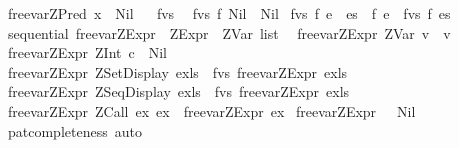 \begin{isabellebody}
{\isacharbar}\ {\isachardoublequoteopen}free{\isacharunderscore}var{\isacharunderscore}ZPred\ x\ {\isacharequal}\ Nil{\isachardoublequoteclose}\isanewline
\isanewline
\ \isanewline
{}\isamarkupfalse%
\ fvs\isanewline
{}\isanewline
\ \ {\isachardoublequoteopen}fvs\ f\ Nil\ {\isacharequal}\ Nil{\isachardoublequoteclose}\isanewline
{\isacharbar}\ {\isachardoublequoteopen}fvs\ f\ {\isacharparenleft}e\ {\isacharhash}\ es{\isacharparenright}\ {\isacharequal}\ {\isacharparenleft}f\ e\ {\isacharat}\ {\isacharparenleft}fvs\ f\ es{\isacharparenright}{\isacharparenright}{\isachardoublequoteclose}\isanewline
\isanewline
\ \isanewline
{}\isamarkupfalse%
\ {\isacharparenleft}sequential{\isacharparenright}\ free{\isacharunderscore}var{\isacharunderscore}ZExpr\ {\isacharcolon}{\isacharcolon}\ {\isachardoublequoteopen}ZExpr\ {\isasymRightarrow}\ ZVar\ list{\isachardoublequoteclose}\isanewline
{}\isanewline
\ \ {\isachardoublequoteopen}free{\isacharunderscore}var{\isacharunderscore}ZExpr\ {\isacharparenleft}ZVar\ v{\isacharparenright}\ {\isacharequal}\ {\isacharbrackleft}v{\isacharbrackright}{\isachardoublequoteclose}\isanewline
{\isacharbar}\ {\isachardoublequoteopen}free{\isacharunderscore}var{\isacharunderscore}ZExpr\ {\isacharparenleft}ZInt\ c{\isacharparenright}\ {\isacharequal}\ Nil{\isachardoublequoteclose}\isanewline
{\isacharbar}\ {\isachardoublequoteopen}free{\isacharunderscore}var{\isacharunderscore}ZExpr\ {\isacharparenleft}ZSetDisplay\ exls{\isacharparenright}\ {\isacharequal}\ fvs\ free{\isacharunderscore}var{\isacharunderscore}ZExpr\ exls{\isachardoublequoteclose}\isanewline
{\isacharbar}\ {\isachardoublequoteopen}free{\isacharunderscore}var{\isacharunderscore}ZExpr\ {\isacharparenleft}ZSeqDisplay\ exls{\isacharparenright}\ {\isacharequal}\ fvs\ free{\isacharunderscore}var{\isacharunderscore}ZExpr\ exls{\isachardoublequoteclose}\isanewline
{\isacharbar}\ {\isachardoublequoteopen}free{\isacharunderscore}var{\isacharunderscore}ZExpr\ {\isacharparenleft}ZCall\ ex\ ex{}{\isacharparenright}\ {\isacharequal}\ free{\isacharunderscore}var{\isacharunderscore}ZExpr\ ex{}{\isachardoublequoteclose}\isanewline
{\isacharbar}\ {\isachardoublequoteopen}free{\isacharunderscore}var{\isacharunderscore}ZExpr\ {\isacharunderscore}\ {\isacharequal}\ Nil{\isachardoublequoteclose}\isanewline
%
\isadelimproof
\ \ %
\endisadelimproof
%
\isatagproof
{}\isamarkupfalse%
\ pat{\isacharunderscore}completeness\ auto%
\endisatagproof
{\isafoldproof}%
%
\isadelimproof
\isanewline
%
\endisadelimproof

\end{isabellebody}
